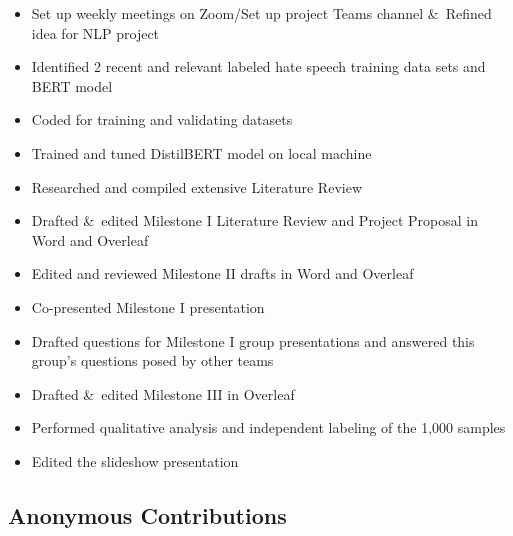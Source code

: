 \documentclass[conference]{IEEEtran}
\begin{document}
\begin{itemize}
  \item Set up weekly meetings on Zoom/Set up project Teams channel \&\ Refined idea for NLP project
  \item Identified 2 recent and relevant labeled hate speech training data sets and BERT model
  \item Coded for training and validating datasets
  \item Trained and tuned DistilBERT model on local machine 
  \item Researched and compiled extensive Literature Review
  \item Drafted \&\ edited Milestone I Literature Review and Project Proposal in Word and Overleaf 
  \item Edited and reviewed Milestone II drafts in Word and Overleaf
  \item Co-presented Milestone I presentation
  \item Drafted questions for Milestone I group presentations and answered this group's questions posed by other teams
  \item Drafted \&\ edited Milestone III in Overleaf
  \item Performed qualitative analysis and independent labeling of the 1,000 samples 
  \item Edited the slideshow presentation 
\end{itemize}

\subsection{Anonymous Contributions}
\end{document}
